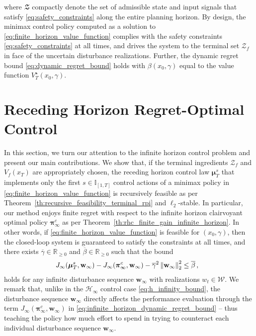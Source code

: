 \documentclass[conference]{IEEEtran}
\newcommand{\norm}[1]{\left\lVert#1\right\rVert}
\begin{document}
where $\mathbfcal{Z}$ compactly denote the set of admissible state and input signals that satisfy \eqref{eq:safety_constraints} along the entire planning horizon. By design, the minimax control policy computed as a solution to \eqref{eq:finite_horizon_value_function} complies with the safety constraints \eqref{eq:safety_constraints} at all times, and drives the system to the terminal set $\mathcal{Z}_f$ in face of the uncertain disturbance realizations. Further, the dynamic regret bound \eqref{eq:dynamic_regret_bound} holds with $\beta(x_0, \gamma)$ equal to the value function $V_T^\star(x_0, \gamma)$.

\section{Receding Horizon Regret-Optimal Control}
\label{sec:infinite_horizon}
In this section, we turn our attention to the infinite horizon control problem and present our main contributions. We show that, if the terminal ingredients $\mathcal{Z}_f$ and $V_f(x_T)$ are appropriately chosen, the receding horizon control law $\bm{\mu}_T^s$ that implements only the first $s \in \mathbb{I}_{[1, T]}$ control actions of a minimax policy in \eqref{eq:finite_horizon_value_function} is recursively feasible as per Theorem~\ref{th:recursive_feasibility_terminal_rpi} and $\ell_2$-stable. In particular, our method enjoys finite regret with respect to the infinite horizon clairvoyant optimal policy $\bm{\pi}^c_\infty$ as per Theorem~\ref{th:rhc_finite_gain_infinite_horizon}. In other words, if \eqref{eq:finite_horizon_value_function} is feasible for $(x_0, \gamma)$, then the closed-loop system is guaranteed to satisfy the constraints at all times, and there exists $\overline{\gamma} \in \mathbb{R}_{\geq 0}$ and $\overline{\beta} \in \mathbb{R}_{\geq 0}$ such that the bound
\begin{align}
    \label{eq:infinite_horizon_dynamic_regret_bound}
    \hspace{-.2cm}
    J_\infty(\bm{\mu}_T^s, \mathbf{w}_{\infty})
    -
    J_\infty(\bm{\pi}_{\infty}^c, \mathbf{w}_{\infty})
    -
    \overline{\gamma}^2 \norm{\mathbf{w}_{\infty}}_2^2 \leq \overline{\beta}\,,
\end{align}
holds for any infinite disturbance sequence $\mathbf{w}_{\infty}$ with realizations $w_t \in \mathcal{W}$. We remark that, unlike in the $\mathcal{H}_\infty$ control case \eqref{eq:h_infinity_bound},
the disturbance sequence $\mathbf{w}_\infty$ directly affects the performance evaluation through the term $J_\infty(\bm{\pi}_{\infty}^c, \mathbf{w}_{\infty})$ in \eqref{eq:infinite_horizon_dynamic_regret_bound} – thus teaching the policy how much effort to spend in trying to counteract each individual disturbance sequence $\mathbf{w}_\infty$.
\end{document}
